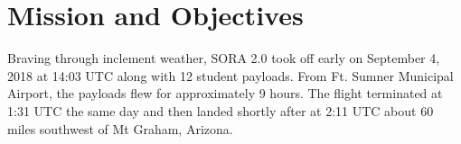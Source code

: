 \section{Mission and Objectives}
\label{sec:Introduction}

Braving through inclement weather, SORA 2.0 took off early on September 4, 2018 at 14:03 UTC along with 12 student payloads.  From Ft. Sumner Municipal Airport, the payloads flew for approximately 9 hours.  The flight terminated at 1:31 UTC the same day and then landed shortly after at 2:11 UTC about 60 miles southwest of Mt Graham, Arizona.


